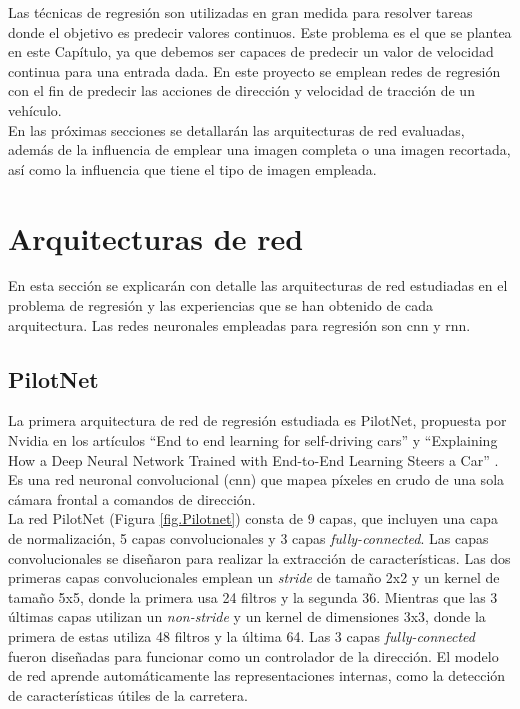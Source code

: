 Las técnicas de regresión son utilizadas en gran medida para resolver tareas donde el objetivo es predecir valores continuos. Este problema es el que se plantea en este Capítulo, ya que debemos ser capaces de predecir un valor de velocidad continua para una entrada dada. En este proyecto se emplean redes de regresión con el fin de predecir las acciones de dirección y velocidad de tracción de un vehículo.\\

En las próximas secciones se detallarán las arquitecturas de red evaluadas, además de la influencia de emplear una imagen completa o una imagen recortada, así como la influencia que tiene el tipo de imagen empleada.\\

\section{Arquitecturas de red}\label{arquitecturas_reg}

En esta sección se explicarán con detalle las arquitecturas de red estudiadas en el problema de regresión y las experiencias que se han obtenido de cada arquitectura. Las redes neuronales empleadas para regresión son \acrshort{cnn} y \acrshort{rnn}.


\subsection{PilotNet}

La primera arquitectura de red de regresión estudiada es PilotNet, propuesta por Nvidia en los artículos ``End to end learning for self-driving cars'' \cite{end2end} y ``Explaining How a Deep Neural Network Trained with End-to-End Learning Steers a Car'' \cite{explaining-end2end}. Es una red neuronal convolucional (\acrshort{cnn}) que mapea píxeles en crudo de una sola cámara frontal a comandos de dirección.\\


La red PilotNet (Figura \ref{fig.Pilotnet}) consta de 9 capas, que incluyen una capa de normalización, 5 capas convolucionales y 3 capas \textit{fully-connected}. Las capas convolucionales se diseñaron para realizar la extracción de características. Las dos primeras capas convolucionales emplean un \textit{stride} de tamaño 2x2 y un kernel de tamaño 5x5, donde la primera usa 24 filtros y la segunda 36. Mientras que las 3 últimas capas utilizan un \textit{non-stride} y un kernel de dimensiones 3x3, donde la primera de estas utiliza 48 filtros y la última 64. Las 3 capas \textit{fully-connected} fueron diseñadas para funcionar como un controlador de la dirección. El modelo de red aprende automáticamente las representaciones internas, como la detección de características útiles de la carretera.\\

